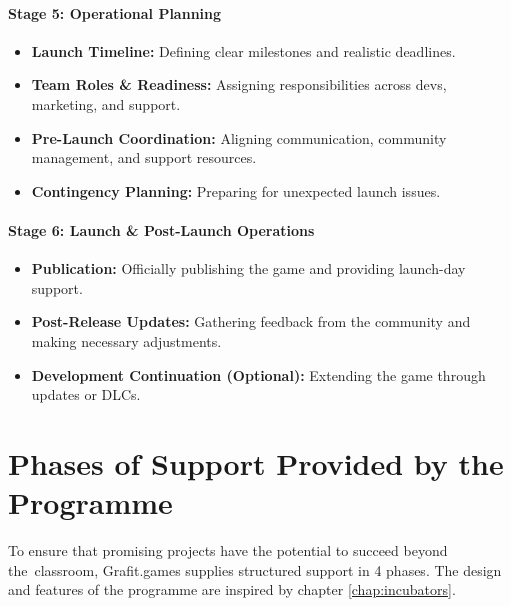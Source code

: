 \paragraph{\large Stage 5: Operational Planning}
\begin{itemize}
    \item \textbf{Launch Timeline:} Defining clear milestones and realistic deadlines.
    \item \textbf{Team Roles \& Readiness:} Assigning responsibilities across devs, marketing, and support.
    \item \textbf{Pre-Launch Coordination:} Aligning communication, community management, and support resources.
    \item \textbf{Contingency Planning:} Preparing for unexpected launch issues.
\end{itemize}
\paragraph{\large Stage 6: Launch \& Post-Launch Operations}
\begin{itemize}
    \item \textbf{Publication:} Officially publishing the game and providing launch-day support.
    \item \textbf{Post-Release Updates:} Gathering feedback from the community and making necessary adjustments.
    \item \textbf{Development Continuation (Optional):} Extending the game through updates or DLCs.
\end{itemize}

\clearpage
\section{Phases of Support Provided by the Programme}
To ensure that promising projects have the potential to succeed beyond the~classroom, Grafit.games supplies structured support in 4 phases. The design and features of the programme are inspired by chapter \ref{chap:incubators}.


